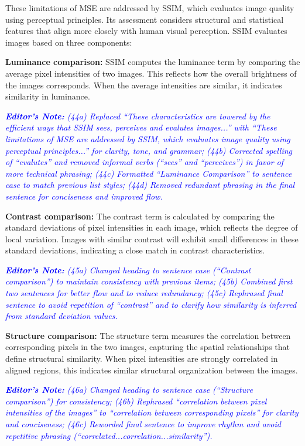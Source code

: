 \documentclass[journal,12pt,onecolumn,draftcls]{IEEEtran}
\newcommand{\editornote}[1]{\par\textit{\textcolor{blue}{\textbf{Editor's Note:} #1}}\par}
\begin{document}
These limitations of MSE are addressed by SSIM, which evaluates image quality using perceptual principles. Its assessment considers structural and statistical features that align more closely with human visual perception. SSIM evaluates images based on three components:

\textbf{Luminance comparison:} SSIM computes the luminance term by comparing the average pixel intensities of two images. This reflects how the overall brightness of the images corresponds. When the average intensities are similar, it indicates similarity in luminance.

\editornote{(44a) Replaced “These characteristics are towered by the efficient ways that SSIM sees, perceives and evalutes images...” with “These limitations of MSE are addressed by SSIM, which evaluates image quality using perceptual principles...” for clarity, tone, and grammar;
(44b) Corrected spelling of “evalutes” and removed informal verbs (“sees” and “perceives”) in favor of more technical phrasing;
(44c) Formatted “Luminance Comparison” to sentence case to match previous list styles;
(44d) Removed redundant phrasing in the final sentence for conciseness and improved flow.}

\textbf{Contrast comparison:} The contrast term is calculated by comparing the standard deviations of pixel intensities in each image, which reflects the degree of local variation. Images with similar contrast will exhibit small differences in these standard deviations, indicating a close match in contrast characteristics.

\editornote{(45a) Changed heading to sentence case (“Contrast comparison”) to maintain consistency with previous items;
(45b) Combined first two sentences for better flow and to reduce redundancy;
(45c) Rephrased final sentence to avoid repetition of “contrast” and to clarify how similarity is inferred from standard deviation values.}

\textbf{Structure comparison:} The structure term measures the correlation between corresponding pixels in the two images, capturing the spatial relationships that define structural similarity. When pixel intensities are strongly correlated in aligned regions, this indicates similar structural organization between the images.

\editornote{(46a) Changed heading to sentence case (“Structure comparison”) for consistency;
(46b) Rephrased “correlation between pixel intensities of the images” to “correlation between corresponding pixels” for clarity and conciseness;
(46c) Reworded final sentence to improve rhythm and avoid repetitive phrasing (“correlated...correlation...similarity”).}
\end{document}
